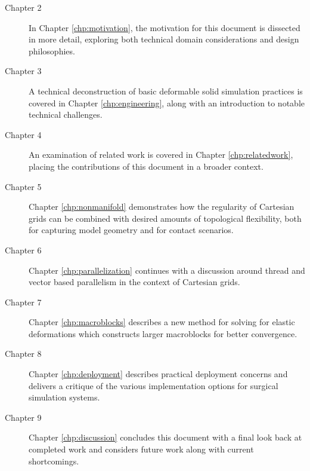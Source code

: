 \begin{description}
\item[Chapter 2] In Chapter \ref{chp:motivation}, the motivation for
  this document is dissected in more detail, exploring both technical
  domain considerations and design philosophies.
\item[Chapter 3] A technical deconstruction of basic deformable solid
  simulation practices is covered in Chapter \ref{chp:engineering},
  along with an introduction to notable technical challenges.
\item[Chapter 4] An examination of related work is covered in Chapter
  \ref{chp:relatedwork}, placing the contributions of this document in
  a broader context.
\item[Chapter 5] Chapter \ref{chp:nonmanifold} demonstrates how the
  regularity of Cartesian grids can be combined with desired amounts
  of topological flexibility, both for capturing model geometry and for
  contact scenarios. 
\item[Chapter 6] Chapter \ref{chp:parallelization} continues with a
discussion around thread and vector based parallelism in the context
of Cartesian grids.
\item[Chapter 7] Chapter \ref{chp:macroblocks} describes a new method
  for solving for elastic deformations which constructs larger
  macroblocks for better convergence.
\item[Chapter 8] Chapter \ref{chp:deployment} describes practical
  deployment concerns and delivers a critique of the various
  implementation options for surgical simulation systems.
\item[Chapter 9] Chapter \ref{chp:discussion} concludes this document
  with a final look back at completed work and considers future work
  along with current shortcomings.
\end{description}

